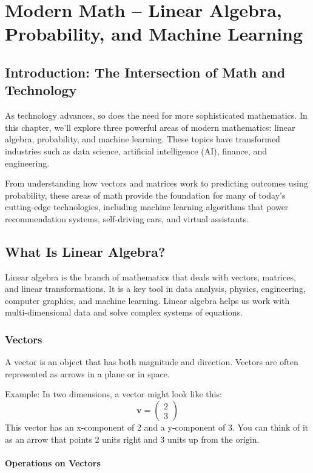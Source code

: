 \chapter{Modern Math – Linear Algebra, Probability, and Machine Learning}

\section{Introduction: The Intersection of Math and Technology}
As technology advances, so does the need for more sophisticated mathematics. In this chapter, we’ll explore three powerful areas of modern mathematics: linear algebra, probability, and machine learning. These topics have transformed industries such as data science, artificial intelligence (AI), finance, and engineering.

From understanding how vectors and matrices work to predicting outcomes using probability, these areas of math provide the foundation for many of today’s cutting-edge technologies, including machine learning algorithms that power recommendation systems, self-driving cars, and virtual assistants.

\section{What Is Linear Algebra?}
Linear algebra is the branch of mathematics that deals with vectors, matrices, and linear transformations. It is a key tool in data analysis, physics, engineering, computer graphics, and machine learning. Linear algebra helps us work with multi-dimensional data and solve complex systems of equations.

\subsection{Vectors}
A vector is an object that has both magnitude and direction. Vectors are often represented as arrows in a plane or in space.

Example: In two dimensions, a vector might look like this:
\[
\mathbf{v} = \begin{pmatrix} 2 \\ 3 \end{pmatrix}
\]
This vector has an x-component of 2 and a y-component of 3. You can think of it as an arrow that points 2 units right and 3 units up from the origin.

\subsubsection{Operations on Vectors}
